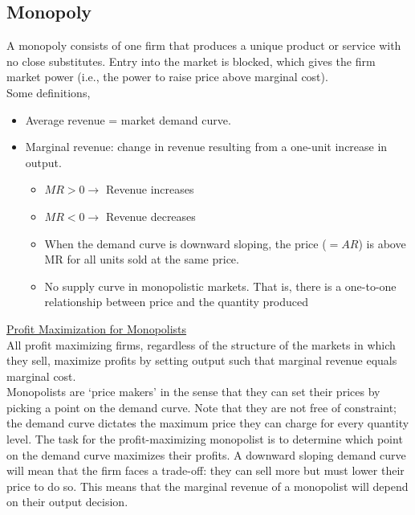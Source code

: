 \documentclass[a4paper, 12pt, reqno]{article}
\begin{document}
\subsection{Monopoly}
A monopoly consists of one firm that produces a unique product or service with no close substitutes. Entry into the market is blocked, which gives the firm market power (i.e., the power to raise price above marginal cost).\\
Some definitions,
\begin{itemize}
\item Average revenue = market demand curve. 
\item Marginal revenue: change in revenue resulting from a one-unit increase in output. 
    \begin{itemize}
        \item $MR > 0 \mbox{} \rightarrow$ Revenue increases
        \item $MR < 0 \mbox{} \rightarrow$ Revenue decreases
        \item When the demand curve is downward sloping, the price ($=AR$) is above MR for all units sold at the same price.
        \item No supply curve in monopolistic markets. That is, there is a one-to-one relationship between price and the quantity produced

    \end{itemize}
\end{itemize}
\underline{Profit Maximization for Monopolists} \\
All profit maximizing firms, regardless of the structure of the markets in which they sell, maximize profits by setting output such that marginal revenue equals marginal cost. \\
Monopolists are ‘price makers’ in the sense that they can set their prices by picking a point on the demand curve. Note that they are not free of constraint; the demand curve dictates the maximum price they can charge for every quantity level. The task for the profit-maximizing monopolist is to determine which point on the demand curve maximizes their profits. A downward sloping demand curve will mean that the firm faces a trade-off: they can sell more but must lower their price to do so. This means that the marginal revenue of a monopolist will depend on their output decision. \\
\end{document}

